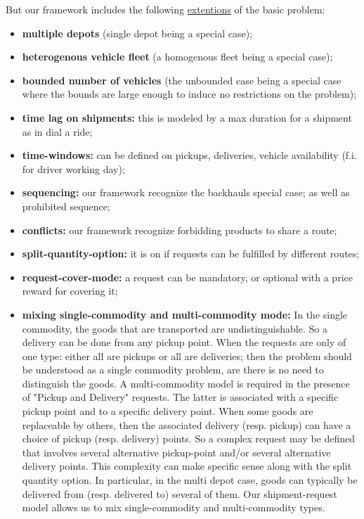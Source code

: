 \documentclass[12pt,a4paper]{article}
\begin{document}
\noindent But our framework includes the following \underline{extentions} of the basic problem:
\begin{itemize}
\item {\bf multiple depots} (single depot being a special case);
\item {\bf heterogenous vehicle fleet} (a homogenous fleet being a special case);
\item {\bf bounded number of vehicles} (the unbounded case  being  a special case where the bounds are large enough to induce no restrictions on the problem);
\item {\bf time lag on shipments:}  this is modeled by a max duration for a  shipment as in dial a ride;
\item {\bf time-windows:}  can be defined on pickups, deliveries, vehicle availability (f.i. for  driver working day);
\item {\bf sequencing:}  our framework recognize the  backhauls special case; as well as prohibited sequence;
\item {\bf  conflicts:}   our framework recognize forbidding products to share a route;
\item {\bf  split-quantity-option:} it is on if requests can be fulfilled by different routes;
\item {\bf  request-cover-mode:} a request can be mandatory, or  optional with a price reward for covering it;
\item {\bf mixing single-commodity and multi-commodity mode: } In the single commodity, the goods that are transported are undistinguishable. So a delivery can be done from any pickup point.  When the requests are only of one type: either all are pickups or all are deliveries; then the problem should be understood as a single commodity problem, are there is no need to distinguish the goods. A multi-commodity model is required in the presence of  "Pickup and Delivery" requests. The latter is associated with a  specific pickup point and to a specific delivery point. 
When some goods are replaceable by others, then the associated delivery (resp. pickup) can have a choice of pickup (resp. delivery) points. So a complex request may be defined that involves several alternative pickup-point and/or several alternative delivery points. This complexity can make specific sense along with the split quantity option. In particular, in the multi depot case, goods can typically be delivered from (resp. delivered to) several of them. Our shipment-request model allows us to mix single-commodity and multi-commodity types. 

\end{itemize}
\end{document}
